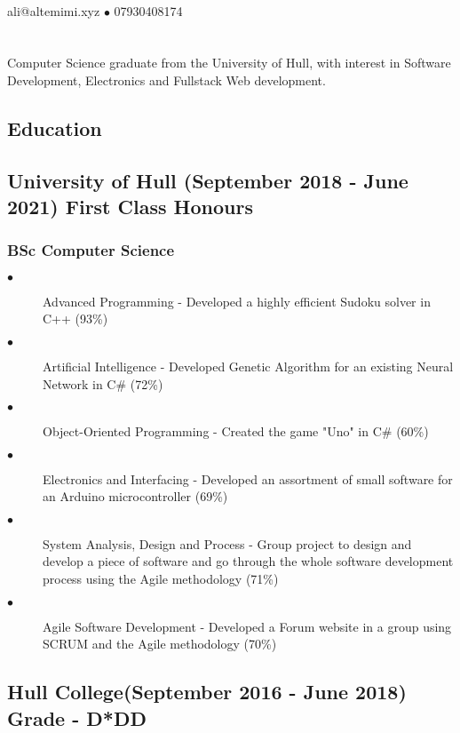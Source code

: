 \documentclass{article}
\author{Ali Al Temimi}
\makeatletter
\renewcommand{\maketitle}{
\begin{center}
    {\huge\bfseries
    \theauthor}
    {\Large \\ali@altemimi.xyz $\bullet$ 07930408174}
    \vspace{-4em}
\end{center}
}
\makeatother
\begin{document}
    \maketitle
\section{}
Computer Science graduate from the University of Hull, with interest in Software Development, Electronics and Fullstack Web development. 
    \begin{multicols}{2}
        \section{Education}
        \subsection{University of Hull (September 2018 - June 2021) First Class Honours}
        \subsubsection{BSc Computer Science}
        \begin{description}
            \item[$\bullet$]Advanced Programming - Developed a highly efficient Sudoku solver in C++ (93\%)
            \item[$\bullet$]Artificial Intelligence - Developed Genetic Algorithm for an existing Neural Network in C\# (72\%)
            \item[$\bullet$]Object-Oriented Programming - Created the game "Uno" in C\# (60\%)
            \item[$\bullet$]Electronics and Interfacing - Developed an assortment of small software for an Arduino microcontroller (69\%)
            \item[$\bullet$]System Analysis, Design and Process - Group project to design and develop a piece of software and go through the whole software development process using the Agile methodology (71\%)
            \item[$\bullet$]Agile Software Development - Developed a Forum website in a group using SCRUM and the Agile methodology (70\%)
        \end{description}
        \subsection{Hull College(September 2016 - June 2018) Grade - D*DD}

\end{multicols}
\end{document}
